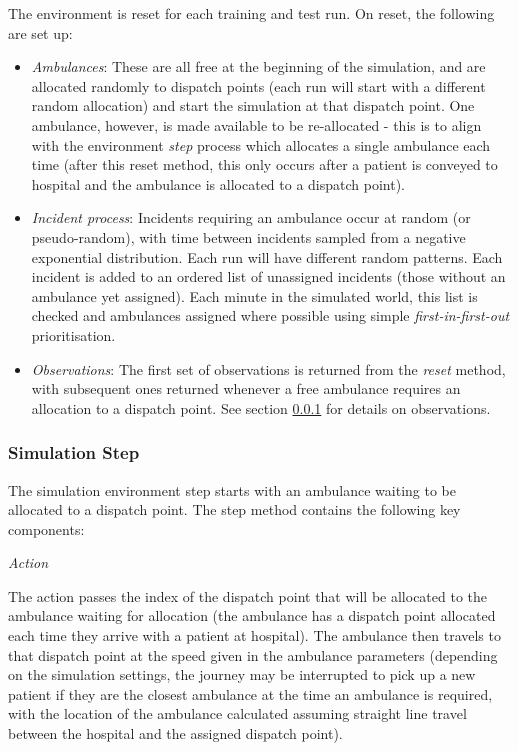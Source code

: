 \documentclass{article}
\begin{document}
The environment is reset for each training and test run. On reset, the following are set up:

\begin{itemize}

    \item \emph{Ambulances}: These are all free at the beginning of the simulation, and are allocated randomly to dispatch points (each run will start with a different random allocation) and start the simulation at that dispatch point. One ambulance, however, is made available to be re-allocated - this is to align with the environment \emph{step} process which allocates a single ambulance each time (after this reset method, this only occurs after a patient is conveyed to hospital and the ambulance is allocated to a dispatch point).
    
    \item \emph{Incident process}: Incidents requiring an ambulance occur at random (or pseudo-random), with time between incidents sampled from a negative exponential distribution. Each run will have different random patterns. Each incident is added to an ordered list of unassigned incidents (those without an ambulance yet assigned). Each minute in the simulated world, this list is checked and ambulances assigned where possible using simple \emph{first-in-first-out} prioritisation.
    
    \item \emph{Observations}: The first set of observations is returned from the \emph{reset} method, with subsequent ones returned whenever a free ambulance requires an allocation to a dispatch point. See section \ref{obs} for details on observations.
    
\end{itemize}

\subsubsection{Simulation Step}
\label{obs}

The simulation environment step starts with an ambulance waiting to be allocated to a dispatch point. The step method contains the following key components:

\emph{Action}

The action passes the index of the dispatch point that will be allocated to the ambulance waiting for allocation (the ambulance has a dispatch point allocated each time they arrive with a patient at hospital). The ambulance then travels to that dispatch point at the speed given in the ambulance parameters (depending on the simulation settings, the journey may be interrupted to pick up a new patient if they are the closest ambulance at the time an ambulance is required, with the location of the ambulance calculated assuming straight line travel between the hospital and the assigned dispatch point).
\end{document}
